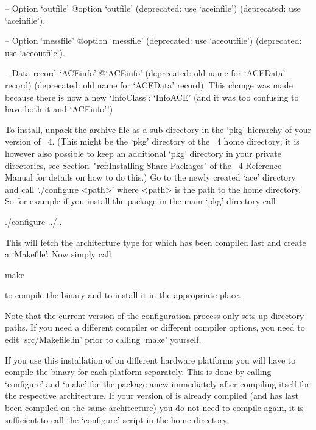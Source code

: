 \item{--} Option    `outfile'{\undoquotes{}
{@option `outfile' (deprecated: use  `aceinfile')}}  (deprecated:  use
`aceinfile').

\item{--} Option    `messfile'{\undoquotes{}
{@option `messfile' (deprecated: use `aceoutfile')}} (deprecated:  use
`aceoutfile').

\item{--} Data      record      `ACEinfo'{\undoquotes{}
{@`ACEinfo' (deprecated: old name for `ACEData' record)}} (deprecated:
old name for `ACEData' record). This change was made because there  is
now a new `InfoClass': `InfoACE' (and it was  too  confusing  to  have
both it and `ACEinfo'!)

\endlist



To install, unpack the archive file as a sub-directory  in  the  `pkg'
hierarchy of your version  of  {\GAP}~4.  (This  might  be  the  `pkg'
directory of the {\GAP}~4 home directory; it is however also  possible
to keep an additional `pkg' directory in your private directories, see
Section~"ref:Installing Share  Packages"  of  the  {\GAP}~4  Reference
Manual for details on how to do this.) Go to the newly  created  `ace'
directory and call `./configure <path>' where <path> is  the  path  to
the {\GAP} home directory. So for example if you install  the  package
in the main `pkg' directory call

\begintt
./configure ../..
\endtt

This  will fetch  the  architecture  type for  which  {\GAP} has  been
compiled last and create a `Makefile'. Now simply call

\begintt
make
\endtt

to compile the binary and to install it in the appropriate place.

Note that the  current version of the configuration  process only sets
up  directory paths.  If you  need a  different compiler  or different
compiler options, you need  to edit `src/Makefile.in' prior to calling
`make' yourself.

If you use this installation of {\GAP} on different hardware platforms
you will have to compile the binary for each platform separately. This
is  done  by calling  `configure'  and  `make'  for the  package  anew
immediately   after  compiling  {\GAP}   itself  for   the  respective
architecture.  If your version of  {\GAP} is already compiled (and has
last  been compiled  on  the same  architecture)  you do  not need  to
compile {\GAP} again, it is  sufficient to call the `configure' script
in the {\GAP} home directory.

